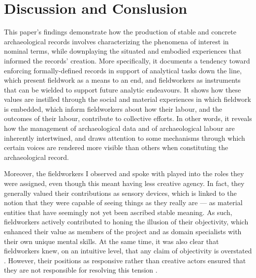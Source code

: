 \documentclass[
]{article}
\author{}
\date{}
\begin{document}
\section{Discussion and Conslusion}\label{discussion-and-conslusion}

This paper's findings demonstrate how the production of stable and
concrete archaeological records involves characterizing the phenomena of
interest in nominal terms, while downplaying the situated and embodied
experiences that informed the records' creation. More specifically, it
documents a tendency toward enforcing formally-defined records in
support of analytical tasks down the line, which present fieldwork as a
means to an end, and fieldworkers as instruments that can be wielded to
support future analytic endeavours. It shows how these values are
instilled through the social and material experiences in which fieldwork
is embedded, which inform fieldworkers about how their labour, and the
outcomes of their labour, contribute to collective efforts. In other
words, it reveals how the management of archaeological data and of
archaeological labour are inherently intertwined, and draws attention to
some mechanisms through which certain voices are rendered more visible
than others when constituting the archaeological record.

Moreover, the fieldworkers I observed and spoke with played into the
roles they were assigned, even though this meant having less creative
agency. In fact, they generally valued their contributions as sensory
devices, which is linked to the notion that they were capable of seeing
things as they really are --- as material entities that have seemingly
not yet been ascribed stable meaning. As such, fieldworkers actively
contributed to honing the illusion of their objectivity, which enhanced
their value as members of the project and as domain specialists with
their own unique mental skills. At the same time, it was also clear that
fieldworkers knew, on an intuitive level, that any claim of objectivity
is overstated \autocite[as per complementary work published
in][12]{batist2024a}. However, their positions as responsive rather than
creative actors ensured that they are not responsible for resolving this
tension \autocite[cf.][]{batist-alienation}.
\end{document}
